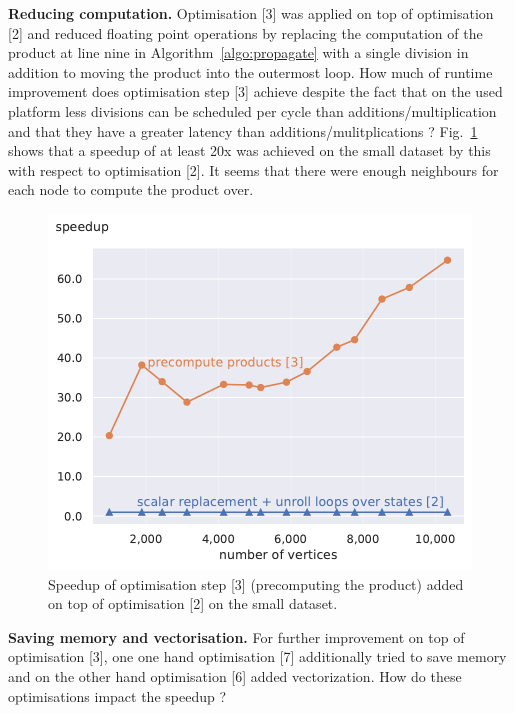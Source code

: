 \documentclass[letterpaper]{article}
\newcommand{\mypar}[1]{{\bf #1.}}
\begin{document}
\mypar{Reducing computation} Optimisation [3] was applied on top of optimisation [2] and reduced floating point operations by replacing the computation of the product at line nine in Algorithm~\ref{algo:propagate} with a single division in addition to moving the product into the outermost loop.
How much of runtime improvement does optimisation step [3] achieve despite the fact that on the used platform less divisions can be scheduled per cycle than additions/multiplication and that they have a greater latency than additions/mulitplications \cite{optimisationManual}?
Fig.~\ref{precomputeSpeedupSmall} shows that a speedup of at least 20x was achieved on the small dataset by this with respect to optimisation [2].
It seems that there were enough neighbours for each node to compute the product over.
\begin{figure}\centering
	\includegraphics[scale=0.58]{img/speedup[2][3]_small.pdf}
	\caption{Speedup of optimisation step [3] (precomputing the product) added on top of optimisation [2] on the small dataset. \label{precomputeSpeedupSmall}}
\end{figure}
\mypar{Saving memory and vectorisation} 
For further improvement on top of optimisation [3], one one hand optimisation [7] additionally tried to save memory and on the other hand optimisation [6] added vectorization.
How do these optimisations impact the speedup ?
\end{document}
